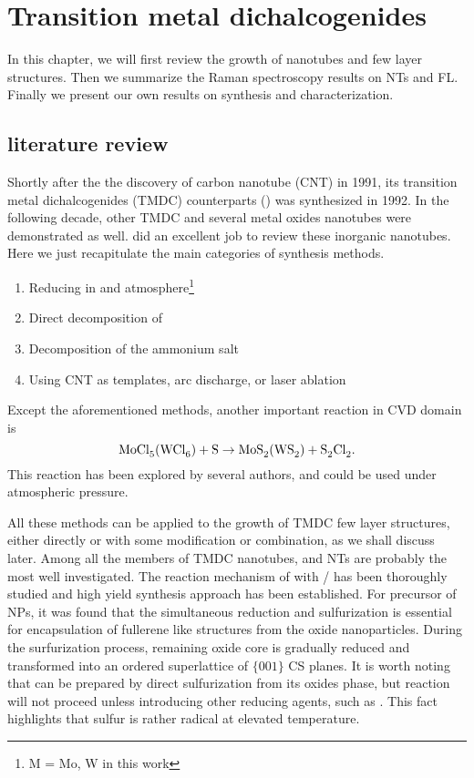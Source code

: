 
\chapter{Transition metal dichalcogenides}

In this chapter, we will first review the growth of  nanotubes and  few layer structures. Then we summarize the Raman spectroscopy results on NTs and FL. Finally we present our own results on synthesis and characterization.


\section{literature review}

Shortly after the the discovery of carbon nanotube (CNT) in 1991,\cite{Iijima1991} its transition metal dichalcogenides (TMDC) counterparts () was synthesized in 1992.\cite{Tenne1992} In the following decade, other TMDC and several metal oxides nanotubes were demonstrated as well. \citeauthor{Rao2003} did an excellent job to review these inorganic nanotubes.\cite{Rao2003} Here we just recapitulate the main categories of synthesis methods.
\begin{enumerate}
\item Reducing  in  and  atmosphere\footnote{M = Mo, W in this work}
\item Direct decomposition of 
\item Decomposition of the ammonium salt 
\item Using CNT as templates, arc discharge, or laser ablation
\end{enumerate}

Except the aforementioned methods, another important reaction in CVD domain is
\[
\cee{MoCl5(WCl6) + S \rightarrow MoS2(WS2) + S2Cl2}.
\]
This reaction has been explored by several authors,\cite{Stoffels1999} and could be used under atmospheric pressure.\cite{Li2004a}

All these methods can be applied to the growth of TMDC few layer structures, either directly or with some modification or combination, as we shall discuss later. Among all the members of TMDC nanotubes,  and  NTs are probably the most well investigated.\cite{Homyonfer1997,Tenne1998,Frey1998,Frey1999,Rothschild2000,Zak2000} The reaction mechanism of  with / has been thoroughly studied \cite{Feldman1998} and high yield synthesis approach has been established.\cite{Margolin2004} For precursor of  NPs, it was found that the simultaneous reduction and sulfurization is essential for encapsulation of fullerene like  structures from the oxide nanoparticles. During the surfurization process, remaining oxide core is gradually reduced and transformed into an ordered superlattice of $\{ 001 \}$ CS planes. It is worth noting that  can be prepared by direct sulfurization from its oxides phase, but reaction  will not proceed unless introducing other reducing agents, such as .\cite{Tsirlina1998} This fact highlights that sulfur is rather radical at elevated temperature.

